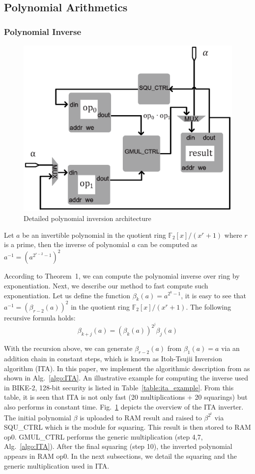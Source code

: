 \documentclass[runningheads]{llncs}
\begin{document}
\subsection{Polynomial Arithmetics}
\subsubsection{Polynomial Inverse}
\begin{figure}[!tb]
\centering
\includegraphics[width=.55\textwidth]{./fig/inv_unit.eps}
\caption{Detailed polynomial inversion architecture}\label{fig:inverter}
\end{figure}

\begin{theorem}
Let $a$ be an invertible polynomial in the quotient ring $\mathbb{F}_2[x]/(x^r+1)$ where $r$ is a prime, then the inverse of polynomial $a$ can be computed as $a^{-1}=(a^{2^{r-2}-1})^2$
\end{theorem}

According to Theorem~1, we can compute the polynomial inverse over ring by exponentiation. Next, we describe our method to fast compute such exponentiation. Let us define the function $\beta_{k}(a)=a^{2^k-1}$, it is easy to see that $a^{-1}=(\beta_{r-2}(a))^2$ in the quotient ring $\mathbb{F}_2[x]/(x^r+1)$. The following recursive
formula holds:
\[
    \beta_{k+j}(a)=(\beta_{k}(a))^{2^j}\beta_{j}(a)
\]

With the recursion above, we can generate $\beta_{r-2}(a)$ from $\beta_{1}(a)=a$ via an addition chain in constant steps, which is known as Itoh-Tsujii Inversion algorithm (ITA). In this paper, we implement the algorithmic description from \cite{hu2015fast} as shown in Alg.~\ref{algo:ITA}. An illustrative example for computing the inverse used in BIKE-2, 128-bit security is listed in Table~\ref{table:ita_example}. From this table, it is seen that ITA is not only fast (20 multiplications + 20 squarings) but also performs in constant time. Fig.~\ref{fig:inverter} depicts the overview of the ITA inverter. The initial polynomial $\beta$ is uploaded to RAM result and raised to ${\beta}^{2^t}$ via SQU\_CTRL which is the module for squaring. This result is then stored to RAM op0. GMUL\_CTRL performs the generic multiplication (step 4,7, Alg.~\ref{algo:ITA}). After the final squaring (step 10), the inverted polynomial appears in RAM op0. In the next subsections, we detail the squaring and the generic multiplication used in ITA.
\end{document}
